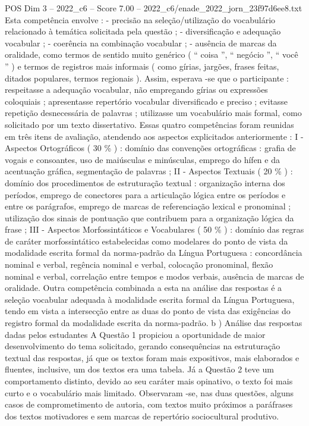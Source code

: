 \begin{textsample}{POS Dim 3 – 2022\_c6 – Score 7.00 – 2022\_c6/enade\_2022\_jorn\_23f97d6ee8.txt}
Esta competência envolve : - precisão na seleção/utilização do vocabulário relacionado à temática solicitada pela questão ; - diversificação e adequação vocabular ; - coerência na combinação vocabular ; - ausência de marcas da oralidade, como termos de sentido muito genérico ( “ coisa ”, “ negócio ”, “ você ” ) e termos de registros mais informais ( como gírias, jargões, frases feitas, ditados populares, termos regionais ).
Assim, esperava -se que o participante : respeitasse a adequação vocabular, não empregando gírias ou expressões coloquiais ; apresentasse repertório vocabular diversificado e preciso ; evitasse repetição desnecessária de palavras ; utilizasse um vocabulário mais formal, como solicitado por um texto dissertativo.
Essas quatro competências foram reunidas em três itens de avaliação, atendendo aos aspectos explicitados anteriormente : I - Aspectos Ortográficos ( 30 \% ) : domínio das convenções ortográficas : grafia de vogais e consoantes, uso de maiúsculas e minúsculas, emprego do hífen e da acentuação gráfica, segmentação de palavras ; II - Aspectos Textuais ( 20 \% ) : domínio dos procedimentos de estruturação textual : organização interna dos períodos, emprego de conectores para a articulação lógica entre os períodos e entre os parágrafos, emprego de marcas de referenciação lexical e pronominal ; utilização dos sinais de pontuação que contribuem para a organização lógica da frase ; III - Aspectos Morfossintáticos e Vocabulares ( 50 \% ) : domínio das regras de caráter morfossintático estabelecidas como modelares do ponto de vista da modalidade escrita formal da norma-padrão da Língua Portuguesa : concordância nominal e verbal, regência nominal e verbal, colocação pronominal, flexão nominal e verbal, correlação entre tempos e modos verbais, ausência de marcas de oralidade.
Outra competência combinada a esta na análise das respostas é a seleção vocabular adequada à modalidade escrita formal da Língua Portuguesa, tendo em vista a intersecção entre as duas do ponto de vista das exigências do registro formal da modalidade escrita da norma-padrão. b ) Análise das respostas dadas pelos estudantes A Questão 1 propiciou a oportunidade de maior desenvolvimento do tema solicitado, gerando consequências na estruturação textual das respostas, já que os textos foram mais expositivos, mais elaborados e fluentes, inclusive, um dos textos era uma tabela.
Já a Questão 2 teve um comportamento distinto, devido ao seu caráter mais opinativo, o texto foi mais curto e o vocabulário mais limitado.
Observaram -se, nas duas questões, alguns casos de comprometimento de autoria, com textos muito próximos a paráfrases dos textos motivadores e sem marcas de repertório sociocultural produtivo.

\end{textsample}
